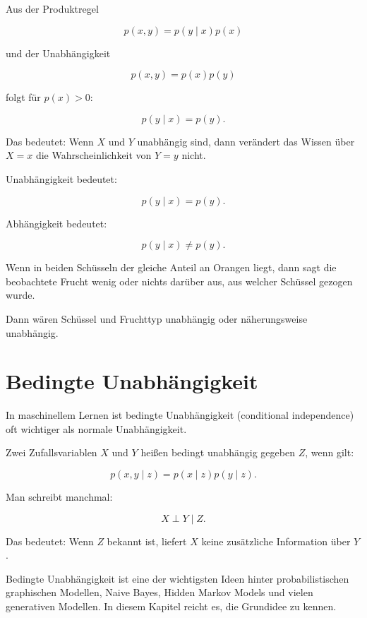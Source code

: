 Aus der Produktregel

\[
    p(x,y)
    =
    p(y \mid x)p(x)
\]

und der Unabhängigkeit

\[
    p(x,y)
    =
    p(x)p(y)
\]

folgt für \(p(x)>0\):

\[
    p(y \mid x)
    =
    p(y).
\]

Das bedeutet:
Wenn \(X\) und \(Y\) unabhängig sind, dann verändert das Wissen über \(X=x\) die Wahrscheinlichkeit von \(Y=y\) nicht.

\begin{conceptbox}
Unabhängigkeit bedeutet:

\[
    p(y \mid x)
    =
    p(y).
\]

Abhängigkeit bedeutet:

\[
    p(y \mid x)
    \neq
    p(y).
\]
\end{conceptbox}

\begin{examplebox}
Wenn in beiden Schüsseln der gleiche Anteil an Orangen liegt, dann sagt die beobachtete Frucht wenig oder nichts darüber aus, aus welcher Schüssel gezogen wurde.

Dann wären Schüssel und Fruchttyp unabhängig oder näherungsweise unabhängig.
\end{examplebox}

\section{Bedingte Unabhängigkeit}

In maschinellem Lernen ist bedingte Unabhängigkeit (conditional independence) oft wichtiger als normale Unabhängigkeit.

\begin{definitionbox}
Zwei Zufallsvariablen \(X\) und \(Y\) heißen bedingt unabhängig gegeben \(Z\), wenn gilt:

\[
    p(x,y \mid z)
    =
    p(x \mid z)p(y \mid z).
\]

Man schreibt manchmal:

\[
    X \perp Y \mid Z.
\]
\end{definitionbox}

Das bedeutet:
Wenn \(Z\) bekannt ist, liefert \(X\) keine zusätzliche Information über \(Y\).

\begin{notebox}
Bedingte Unabhängigkeit ist eine der wichtigsten Ideen hinter probabilistischen graphischen Modellen, Naive Bayes, Hidden Markov Models und vielen generativen Modellen.
In diesem Kapitel reicht es, die Grundidee zu kennen.
\end{notebox}

